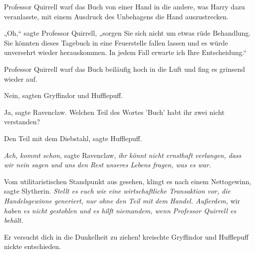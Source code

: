 Professor Quirrell warf das Buch von einer Hand in die andere, was Harry dazu veranlasste, mit einem Ausdruck des Unbehagens die Hand auszustrecken.

„Oh,“ sagte Professor Quirrell, „sorgen Sie sich nicht um etwas rüde Behandlung. Sie könnten dieses Tagebuch in eine Feuerstelle fallen lassen und es würde unversehrt wieder herauskommen. In jedem Fall erwarte ich Ihre Entscheidung.“

Professor Quirrell warf das Buch beiläufig hoch in die Luft und fing es grinsend wieder auf.

Nein, sagten Gryffindor und Hufflepuff.

Ja, sagte Ravenclaw. Welchen Teil des Wortes 'Buch' habt ihr zwei nicht verstanden?

Den Teil mit dem Diebstahl, sagte Hufflepuff.

\emph{Ach, kommt schon,} sagte Ravenclaw, \emph{ihr könnt nicht ernsthaft verlangen, dass wir nein sagen und uns den Rest unseres Lebens fragen, was es war.}

Vom utilitaristischen Standpunkt aus gesehen, klingt es nach einem Nettogewinn, sagte Slytherin. \emph{Stellt es euch wie eine wirtschaftliche Transaktion vor, die Handelsgewinne generiert, nur ohne den Teil mit dem Handel. Außerdem,} wir \emph{haben es nicht gestohlen und es hilft niemandem, wenn Professor Quirrell es behält.}

Er versucht dich in die Dunkelheit zu ziehen! kreischte Gryffindor und Hufflepuff nickte entschieden.

